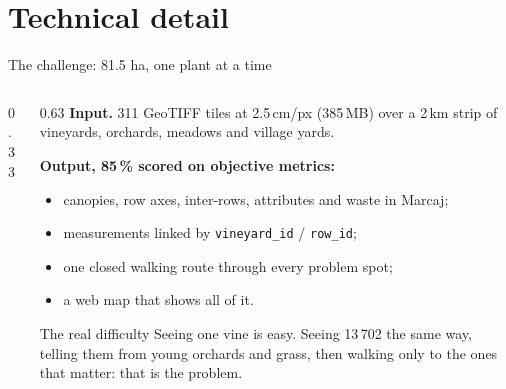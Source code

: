 \section{Technical detail}

\begin{frame}{The challenge: 81.5 ha, one plant at a time}
  \begin{columns}[T]
    \begin{column}{0.33\textwidth}
    \end{column}
    \begin{column}{0.63\textwidth}
      \footnotesize
      \textbf{Input.} 311 GeoTIFF tiles at 2.5\,cm/px (385\,MB) over a 2\,km strip of vineyards,
      orchards, meadows and village yards.
      \vspace{1mm}

      \textbf{Output, 85\,\% scored on objective metrics:}
      \begin{itemize}\setlength{\itemsep}{0.3mm}\scriptsize
        \item canopies, row axes, inter-rows, attributes and waste in Marcaj;
        \item measurements linked by \texttt{vineyard\_id} / \texttt{row\_id};
        \item one closed walking route through every problem spot;
        \item a web map that shows all of it.
      \end{itemize}
      \vspace{1.5mm}
      \begin{sxcard}{The real difficulty}
        Seeing one vine is easy. Seeing 13\,702 the same way, telling them from young orchards and grass,
        then walking only to the ones that matter: that is the problem.
      \end{sxcard}
    \end{column}
  \end{columns}
\end{frame}

